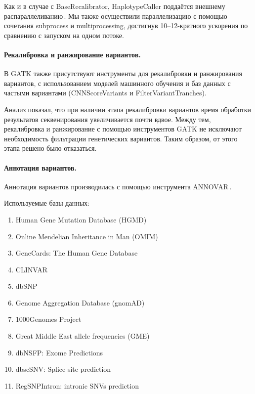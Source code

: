 \documentclass[a4paper,14pt]{extarticle}
\newcommand{\utilname}[1]{\textenglish{#1}}
\newcommand{\ecitep}[1]{\textenglish{\citep{#1}}}
\begin{document}
Как и в случае с \utilname{BaseRecalibrator}, \utilname{HaplotypeCaller} поддаётся внешнему распараллеливанию\,\ecitep{Heldenbrand_2019}.
Мы также осуществили параллелизацию с помощью сочетания \utilname{subprocess} и \utilname{multiprocessing}, достигнув 10--12-кратного ускорения по сравнению с запуском на одном потоке.

\paragraph{Рекалибровка и ранжирование вариантов.}
В GATK также присутствуют инструменты для рекалибровки и ранжирования вариантов, с использованием моделей машинного обучения и баз данных с частыми вариантами (\utilname{CNNScoreVariants} и \utilname{FilterVariantTranches}).

Анализ показал, что при наличии этапа рекалибровки вариантов время обработки результатов секвенирования увеличивается почти вдвое.
Между тем, рекалибровка и ранжирование с помощью инструментов GATK не исключают необходимость фильтрации генетических вариантов.
Таким образом, от этого этапа решено было отказаться.

\paragraph{Аннотация вариантов.}
Аннотация вариантов производилась с помощью инструмента \utilname{ANNOVAR}\,\ecitep{Wang_2010}.

Используемые базы данных:

\begin{enumerate}
	\item Human Gene Mutation Database (HGMD\textregistered)\,\ecitep{Stenson_2017}
	\item Online Mendelian Inheritance in Man (OMIM\textregistered)\,\ecitep{Amberger_2014}
	\item GeneCards\textregistered: The Human Gene Database\,\ecitep{Stelzer_2016}
	\item CLINVAR\,\ecitep{Landrum_2017}
	\item dbSNP\,\ecitep{Sherry_2001}
	\item Genome Aggregation Database (gnomAD)\,\ecitep{Karczewski_2020}
	\item 1000Genomes Project\,\ecitep{Auton_2015}
	\item Great Middle East allele frequencies (GME)\,\ecitep{Scott_2016}
	\item dbNSFP: Exome Predictions\,\ecitep{Liu_2016}
	\item dbscSNV: Splice site prediction\,\ecitep{Jian_2013}
	\item RegSNPIntron: intronic SNVs prediction\,\ecitep{Lin_2019}
\end{enumerate}
\end{document}
